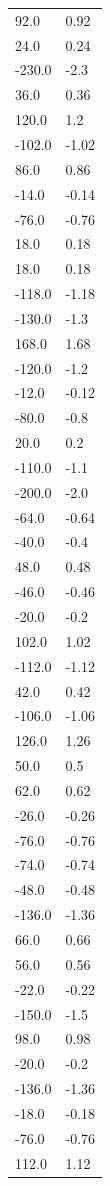 \begin{longtable}{ll}
92.0 & 0.92 \\
24.0 & 0.24 \\
-230.0 & -2.3 \\
36.0 & 0.36 \\
120.0 & 1.2 \\
-102.0 & -1.02 \\
86.0 & 0.86 \\
-14.0 & -0.14 \\
-76.0 & -0.76 \\
18.0 & 0.18 \\
18.0 & 0.18 \\
-118.0 & -1.18 \\
-130.0 & -1.3 \\
168.0 & 1.68 \\
-120.0 & -1.2 \\
-12.0 & -0.12 \\
-80.0 & -0.8 \\
20.0 & 0.2 \\
-110.0 & -1.1 \\
-200.0 & -2.0 \\
-64.0 & -0.64 \\
-40.0 & -0.4 \\
48.0 & 0.48 \\
-46.0 & -0.46 \\
-20.0 & -0.2 \\
102.0 & 1.02 \\
-112.0 & -1.12 \\
42.0 & 0.42 \\
-106.0 & -1.06 \\
126.0 & 1.26 \\
50.0 & 0.5 \\
62.0 & 0.62 \\
-26.0 & -0.26 \\
-76.0 & -0.76 \\
-74.0 & -0.74 \\
-48.0 & -0.48 \\
-136.0 & -1.36 \\
66.0 & 0.66 \\
56.0 & 0.56 \\
-22.0 & -0.22 \\
-150.0 & -1.5 \\
98.0 & 0.98 \\
-20.0 & -0.2 \\
-136.0 & -1.36 \\
-18.0 & -0.18 \\
-76.0 & -0.76 \\
112.0 & 1.12 \\

\end{longtable}
